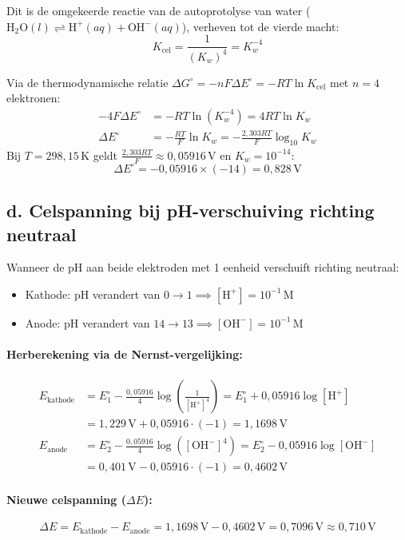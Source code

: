 \documentclass[11pt]{article}
\begin{document}
Dit is de omgekeerde reactie van de autoprotolyse van water ($\text{H}_2\text{O}(l) \rightleftharpoons \text{H}^+(aq) + \text{OH}^-(aq)$), verheven tot de vierde macht:
\begin{equation*}
K_{\text{cel}} = \frac{1}{(K_w)^4} = K_w^{-4}
\end{equation*}

Via de thermodynamische relatie $\Delta G^\circ = -n F \Delta E^\circ = -R T \ln K_{\text{cel}}$ met $n = 4$ elektronen:
\begin{align*}
-4 F \Delta E^\circ &= -R T \ln (K_w^{-4}) = 4 R T \ln K_w \\
\Delta E^\circ &= -\frac{R T}{F} \ln K_w = -\frac{2{,}303 R T}{F} \log_{10} K_w
\end{align*}
Bij $T = 298{,}15\,\text{K}$ geldt $\frac{2{,}303 R T}{F} \approx 0{,}05916\,\text{V}$ en $K_w = 10^{-14}$:
\begin{equation*}
\Delta E^\circ = -0{,}05916 \times (-14) = 0{,}828\,\text{V}
\end{equation*}

\subsection*{d. Celspanning bij pH-verschuiving richting neutraal}

Wanneer de pH aan beide elektroden met 1 eenheid verschuift richting neutraal:
\begin{itemize}
    \item Kathode: $\text{pH}$ verandert van $0 \rightarrow 1 \implies [\text{H}^+] = 10^{-1}\,\text{M}$
    \item Anode: $\text{pH}$ verandert van $14 \rightarrow 13 \implies [\text{OH}^-] = 10^{-1}\,\text{M}$
\end{itemize}

\paragraph{Herberekening via de Nernst-vergelijking:}
\begin{align*}
E_{\text{kathode}} &= E^\circ_1 - \frac{0{,}05916}{4} \log \left( \frac{1}{[\text{H}^+]^4} \right) = E^\circ_1 + 0{,}05916 \log [\text{H}^+] \\
&= 1{,}229\,\text{V} + 0{,}05916 \cdot (-1) = 1{,}1698\,\text{V} \\[1ex]
E_{\text{anode}} &= E^\circ_2 - \frac{0{,}05916}{4} \log \left( [\text{OH}^-]^4 \right) = E^\circ_2 - 0{,}05916 \log [\text{OH}^-] \\
&= 0{,}401\,\text{V} - 0{,}05916 \cdot (-1) = 0{,}4602\,\text{V}
\end{align*}

\paragraph{Nieuwe celspanning ($\Delta E$):}
\begin{equation*}
\Delta E = E_{\text{kathode}} - E_{\text{anode}} = 1{,}1698\,\text{V} - 0{,}4602\,\text{V} = 0{,}7096\,\text{V} \approx 0{,}710\,\text{V}
\end{equation*}
\end{document}
